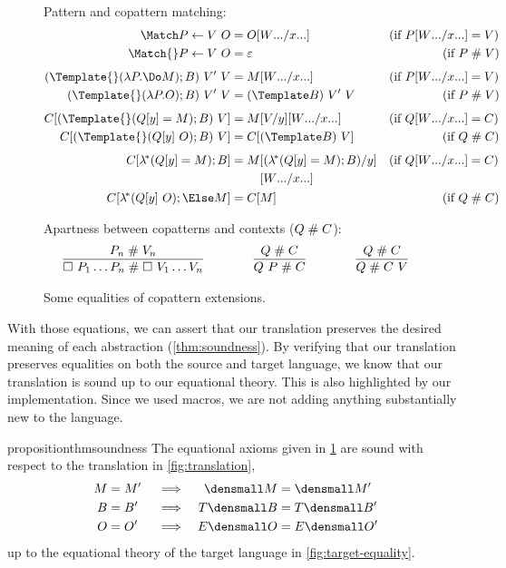 \begin{figure}
Pattern and copattern matching:
\begin{align*}
  \Match P \gets V ~ O
  &=
  O\subst{\many{x}}{\many{W}}
  &(\text{if } P\subst{\many{x}}{\many{W}} &= V)
  \\
  \Match{} P \gets V ~ O
  &=
  \varepsilon
  &(\text{if } P &\apart V)
  \\[1ex]
  (\Template{} (\lambda P. \Do M); B) ~ V' ~ V
  &=
  M\subst{\many{x}}{\many{W}}
  &(\text{if } P\subst{\many{x}}{\many{W}} &= V)
  \\
  (\Template{} (\lambda P. O); B) ~ V' ~ V
  &=
  (\Template B) ~ V' ~ V
  &(\text{if } P &\apart V)
  \\[1ex]
  C[(\Template{} (Q[y] = M); B) ~ V]
  &=
  M\subst{y}{V}\subst{\many{x}}{\many{W}}
  &(\text{if } Q\subst{\many{x}}{\many{W}} &= C)
  \\
  C[(\Template{} (Q[y] ~ O); B) ~ V]
  &=
  C[(\Template B) ~ V]
  &(\text{if } Q &\apart C)
  \\[1ex]
  C[\lamstar (Q[y] = M); B]
  &=
  \begin{aligned}[t]
    M
    &\subst{y}{(\lamstar (Q[y] = M); B)}
    \\
    &\subst{\many{x}}{\many{W}}
  \end{aligned}
  &(\text{if } Q\subst{\many{x}}{\many{W}} &= C)
  \\
  C[\lamstar (Q[y] ~ O); \Else M]
  &=
  C[M]
  &(\text{if } Q &\apart C)
\end{align*}

Apartness between copatterns and contexts ($Q \mathrel{\#} C$):
\begin{gather*}
  \infer
  {\hole ~ P_1 \dots P_n \apart \hole ~ V_1 \dots V_n}
  {P_n \apart V_n}
  \qqqquad
  \infer
  {Q ~ P \apart C}
  {Q \apart C}
  \qqqquad
  \infer
  {Q \apart C ~ V}
  {Q \apart C}
\end{gather*}

\caption{Some equalities of copattern extensions.}
\label{fig:source-equality}
\end{figure}


With those equations, we can assert that our translation preserves the desired meaning of each abstraction (\cref{thm:soundness}).
By verifying that our translation preserves equalities on both the source and target language, we know that our translation is sound up to our equational theory.
This is also highlighted by our implementation.
Since we used macros, we are not adding anything substantially new to the language.

\begin{restatable}[Soundness]{proposition}{thmsoundness}
  \label{thm:soundness}
  The equational axioms given in \cref{fig:source-equality} are sound with
  respect to the translation in \cref{fig:translation},
  \begin{align*}
    M &= M' &&\implies & \den{M} &= \den{M'} \\
    B &= B' &&\implies & T\den{B} &= T\den{B'} \\
    O &= O' &&\implies & E\den{O} &= E\den{O'}
  \end{align*}
  up to the equational theory of the target language in
  \cref{fig:target-equality}.
\end{restatable}


